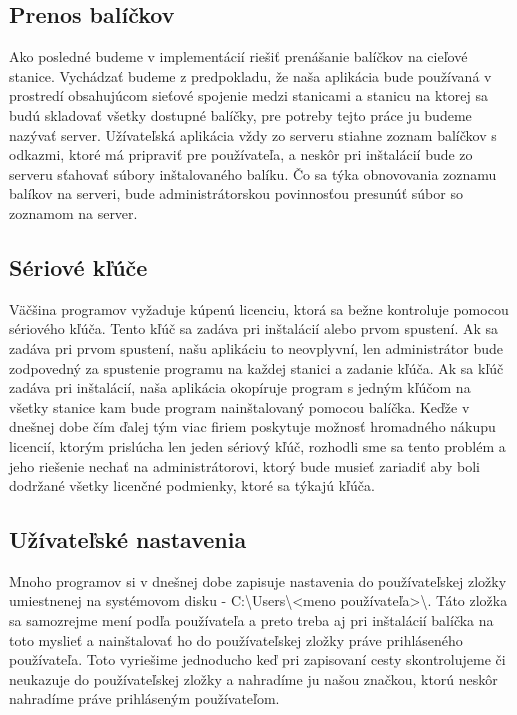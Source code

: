 \subsection{Prenos balíčkov}
Ako posledné budeme v implementácií riešiť prenášanie balíčkov na cieľové stanice. Vychádzať budeme z predpokladu, že naša aplikácia bude používaná v prostredí obsahujúcom sieťové spojenie medzi stanicami a stanicu na ktorej sa budú skladovať všetky dostupné balíčky, pre potreby tejto práce ju budeme nazývať server. Užívateľská aplikácia vždy zo serveru stiahne zoznam balíčkov s odkazmi, ktoré má pripraviť pre používateľa, a neskôr pri inštalácií bude zo serveru sťahovať súbory inštalovaného balíku. Čo sa týka obnovovania zoznamu balíkov na serveri, bude administrátorskou povinnosťou presunúť súbor so zoznamom na server.

\subsection{Sériové kľúče}
Väčšina programov vyžaduje kúpenú licenciu, ktorá sa bežne kontroluje pomocou sériového kľúča. Tento kľúč sa zadáva pri inštalácií alebo prvom spustení. Ak sa zadáva pri prvom spustení, našu aplikáciu to neovplyvní, len administrátor bude zodpovedný za spustenie programu na každej stanici a zadanie kľúča. Ak sa kľúč zadáva pri inštalácií, naša aplikácia okopíruje program s jedným kľúčom na všetky stanice kam bude program nainštalovaný pomocou balíčka. Keďže v dnešnej dobe čím ďalej tým viac firiem poskytuje možnosť hromadného nákupu licencií, ktorým prislúcha len jeden sériový kľúč, rozhodli sme sa tento problém a jeho riešenie nechať na administrátorovi, ktorý bude musieť zariadiť aby boli dodržané všetky licenčné podmienky, ktoré sa týkajú kľúča.

\subsection{Užívateľské nastavenia}
Mnoho programov si v dnešnej dobe zapisuje nastavenia do používateľskej zložky umiestnenej na systémovom disku - C:\textbackslash Users\textbackslash\textless meno používateľa\textgreater\textbackslash. Táto zložka sa samozrejme mení podľa používateľa a preto treba aj pri inštalácií balíčka na toto myslieť a nainštalovať ho do používateľskej zložky práve prihláseného používateľa. Toto vyriešime jednoducho keď pri zapisovaní cesty skontrolujeme či neukazuje do používateľskej zložky a nahradíme ju našou značkou, ktorú neskôr nahradíme práve prihláseným používateľom.

